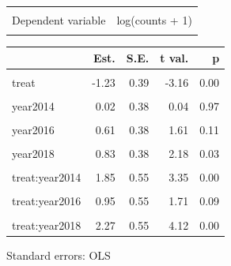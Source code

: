 \documentclass[
]{article}
\begin{document}
\begin{table}[!h]
\centering
\begin{tabular}{lr}
\toprule
\cellcolor{gray!10}{Observations} & \cellcolor{gray!10}{252}\\
Dependent variable & log(counts + 1)\\
\cellcolor{gray!10}{Type} & \cellcolor{gray!10}{OLS linear regression}\\
\bottomrule
\end{tabular}
\end{table}  \begin{table}[!h]
\centering
\begin{threeparttable}
\begin{tabular}{lrrrr}
\toprule
  & Est. & S.E. & t val. & p\\
\midrule
\cellcolor{gray!10}{(Intercept)} & \cellcolor{gray!10}{1.95} & \cellcolor{gray!10}{0.27} & \cellcolor{gray!10}{7.26} & \cellcolor{gray!10}{0.00}\\
treat & -1.23 & 0.39 & -3.16 & 0.00\\
\cellcolor{gray!10}{year2013} & \cellcolor{gray!10}{-0.27} & \cellcolor{gray!10}{0.38} & \cellcolor{gray!10}{-0.71} & \cellcolor{gray!10}{0.48}\\
year2014 & 0.02 & 0.38 & 0.04 & 0.97\\
\cellcolor{gray!10}{year2015} & \cellcolor{gray!10}{0.49} & \cellcolor{gray!10}{0.38} & \cellcolor{gray!10}{1.30} & \cellcolor{gray!10}{0.20}\\
\addlinespace
year2016 & 0.61 & 0.38 & 1.61 & 0.11\\
\cellcolor{gray!10}{year2017} & \cellcolor{gray!10}{1.04} & \cellcolor{gray!10}{0.38} & \cellcolor{gray!10}{2.73} & \cellcolor{gray!10}{0.01}\\
year2018 & 0.83 & 0.38 & 2.18 & 0.03\\
\cellcolor{gray!10}{treat:year2013} & \cellcolor{gray!10}{1.16} & \cellcolor{gray!10}{0.55} & \cellcolor{gray!10}{2.10} & \cellcolor{gray!10}{0.04}\\
treat:year2014 & 1.85 & 0.55 & 3.35 & 0.00\\
\addlinespace
\cellcolor{gray!10}{treat:year2015} & \cellcolor{gray!10}{2.25} & \cellcolor{gray!10}{0.55} & \cellcolor{gray!10}{4.08} & \cellcolor{gray!10}{0.00}\\
treat:year2016 & 0.95 & 0.55 & 1.71 & 0.09\\
\cellcolor{gray!10}{treat:year2017} & \cellcolor{gray!10}{1.22} & \cellcolor{gray!10}{0.55} & \cellcolor{gray!10}{2.20} & \cellcolor{gray!10}{0.03}\\
treat:year2018 & 2.27 & 0.55 & 4.12 & 0.00\\
\bottomrule
\end{tabular}
\begin{tablenotes}
\item Standard errors: OLS
\end{tablenotes}
\end{threeparttable}
\end{table}
\end{document}
